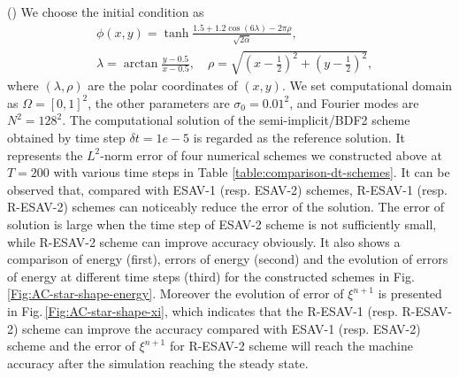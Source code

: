 \documentclass[final,review,onefignum,onetabnum]{siamart190516}
\theoremstyle{plain}
\begin{document}
()  We choose the initial condition as            
\begin{equation}\label{eq:AC-CH-initial-condition-star-shape}
\begin{aligned}
	& \phi(x, y)=\tanh \frac{1.5+1.2 \cos (6 \lambda)-2 \pi \rho}{\sqrt{2\alpha}}, \\ 
	& \lambda=\arctan \frac{y-0.5}{x-0.5}, \quad \rho=\sqrt{\left(x-\frac{1}{2}\right)^{2}+\left(y-\frac{1}{2}\right)^{2}},
\end{aligned}
\end{equation}
where $(\lambda, \rho)$ are the polar coordinates of $(x, y)$. 
We set computational domain as $\Omega=[0, 1]^{2}$, the other parameters are $\sigma_0=0.01^2$, and Fourier modes are $N^2=128^2$. 
The computational solution of the semi-implicit/BDF2 scheme obtained by time step $ \delta t = 1e-5$  is regarded as the reference solution. 
It represents the $L^{2}$-norm error of four numerical schemes  we constructed above at $T=200$ with various time steps in Table \ref{table:comparison-dt-schemes}. 
It can be observed that, compared with ESAV-1 (resp. ESAV-2) schemes, R-ESAV-1 (resp. R-ESAV-2) schemes can noticeably reduce the error of the solution. 
The error of solution is large when the time step of ESAV-2 scheme is not sufficiently small, while R-ESAV-2 scheme can  improve accuracy obviously. 
It also shows a comparison of energy (first), errors of energy (second) and the evolution of errors of energy at different time steps (third) for the constructed schemes in Fig.\,\ref{Fig:AC-star-shape-energy}. 
Moreover the evolution of error of $\xi^{n+1}$ is presented in Fig.\,\ref{Fig:AC-star-shape-xi},  which indicates that the R-ESAV-1 (resp. R-ESAV-2) scheme can improve the accuracy compared with ESAV-1 (resp. ESAV-2) scheme and the error of  $\xi^{n+1}$ for R-ESAV-2 scheme will reach the machine accuracy after the simulation reaching the steady state. 
\end{document}
